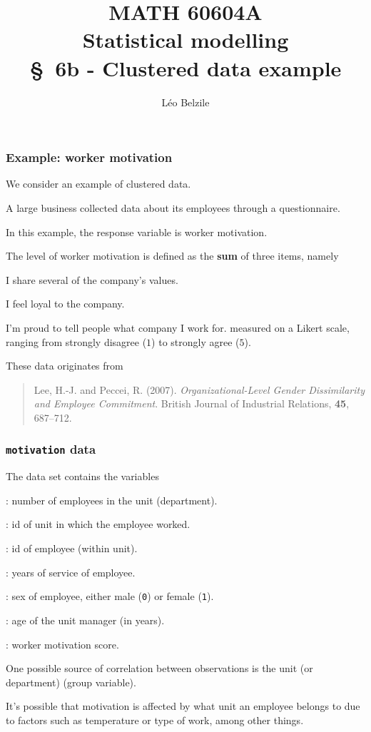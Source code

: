 \documentclass{beamer}
\title[\color{white}{MATH 60604A \S~6b - Clustered data example}]{\texorpdfstring{MATH 60604A \\Statistical modelling \\ \S~6b - Clustered data example}{MATH 60604A \\Statistical modelling \\ \S~6b - Clustered data example}}
\author{Léo Belzile}
\institute{HEC Montréal\\
Department of Decision Sciences}
\date{}
\begin{document}
\frame{\titlepage}

\begin{frame}[fragile]
\frametitle{Example: worker motivation}
We consider an example of clustered data.
\bi
\item  A large business collected data about its employees through a questionnaire. 
\item In this example, the response variable is \alert{worker motivation}. 
\item The level of worker motivation is defined as the \textbf{sum} of three items, namely
\bi

\item I share several of the company's values.
\item I feel loyal to the company.
\item I'm proud to tell people what company I work for.
\ei
measured on a Likert scale, ranging from strongly disagree ($1$) to strongly agree ($5$).
\item These data originates from

\begin{quote}
Lee, H.-J. and Peccei, R. (2007). \textsl{Organizational-Level Gender Dissimilarity and
Employee Commitment}. British Journal of Industrial Relations, \textbf{45}, 687--712.
\end{quote}
\ei
\end{frame}

\begin{frame}[fragile]
\frametitle{\texttt{motivation} data}
 The  data set contains the variables%
\bi

\item {}: number of employees in the unit (department).
\item {}: id of unit in which the employee worked.
\item  {}: id of employee (within unit).
\item {}: years of service of employee.
\item {}: sex of employee, either male (\texttt{0}) or female (\texttt{1}).
\item  {}: age of the unit manager (in years).
\item {}: worker motivation score.
\ei

\bi
\item  One possible source of correlation between observations is the \alert{unit (or department)} (group variable). 
\item It's possible that motivation is affected by what unit an employee belongs to due to factors such as temperature or type of work, among other things.
\ei
\end{frame}
\end{document}
